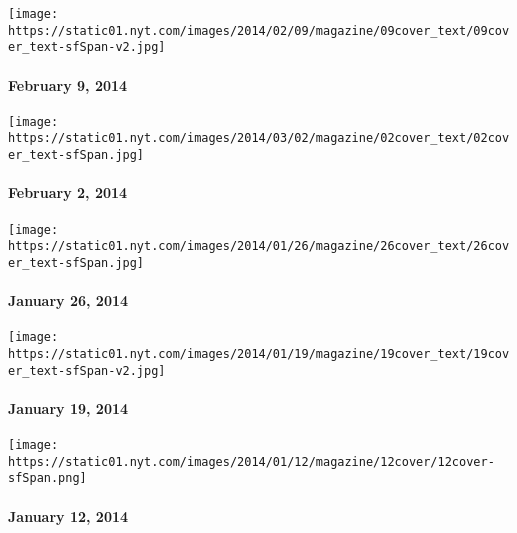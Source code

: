 \href{http://www.nytimes.com/indexes/2014/02/09/magazine/index.html}{}

\texttt{[image: https://static01.nyt.com/images/2014/02/09/magazine/09cover\_text/09cover\_text-sfSpan-v2.jpg]}

\hypertarget{february-9-2014}{%
\paragraph{February 9, 2014}\label{february-9-2014}}

\href{http://www.nytimes.com/indexes/2014/02/02/magazine/index.html}{}

\texttt{[image: https://static01.nyt.com/images/2014/03/02/magazine/02cover\_text/02cover\_text-sfSpan.jpg]}

\hypertarget{february-2-2014}{%
\paragraph{February 2, 2014}\label{february-2-2014}}

\href{http://www.nytimes.com/indexes/2014/01/26/magazine/index.html}{}

\texttt{[image: https://static01.nyt.com/images/2014/01/26/magazine/26cover\_text/26cover\_text-sfSpan.jpg]}

\hypertarget{january-26-2014}{%
\paragraph{January 26, 2014}\label{january-26-2014}}

\href{http://www.nytimes.com/indexes/2014/01/19/magazine/index.html}{}

\texttt{[image: https://static01.nyt.com/images/2014/01/19/magazine/19cover\_text/19cover\_text-sfSpan-v2.jpg]}

\hypertarget{january-19-2014}{%
\paragraph{January 19, 2014}\label{january-19-2014}}

\href{http://www.nytimes.com/indexes/2014/01/12/magazine/index.html}{}

\texttt{[image: https://static01.nyt.com/images/2014/01/12/magazine/12cover/12cover-sfSpan.png]}

\hypertarget{january-12-2014}{%
\paragraph{January 12, 2014}\label{january-12-2014}}

